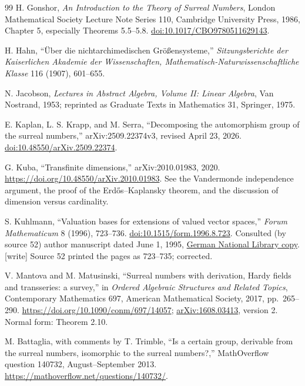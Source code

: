 \documentclass[11pt,letterpaper]{article}
\numberwithin{equation}{section}
\theoremstyle{definition}
\theoremstyle{remark}
\newcommand{\wtag}{\textup{[write]}}%
\begin{document}
\begin{thebibliography}{99}
H. Gonshor,
\emph{An Introduction to the Theory of Surreal Numbers},
London Mathematical Society Lecture Note Series 110,
Cambridge University Press, 1986, Chapter 5, especially Theorems 5.5--5.8.
\href{https://doi.org/10.1017/CBO9780511629143}{doi:10.1017/CBO9780511629143}.

H. Hahn,
``{\"U}ber die nichtarchimedischen Gr{\"o}{\ss}ensysteme,''
\emph{Sitzungsberichte der Kaiserlichen Akademie der Wissenschaften,
Mathematisch-Naturwissenschaftliche Klasse} 116 (1907), 601--655.

N. Jacobson,
\emph{Lectures in Abstract Algebra, Volume II: Linear Algebra},
Van Nostrand, 1953; reprinted as Graduate Texts in Mathematics 31,
Springer, 1975.

E. Kaplan, L. S. Krapp, and M. Serra,
``Decomposing the automorphism group of the surreal numbers,''
arXiv:2509.22374v3, revised April 23, 2026.
\href{https://doi.org/10.48550/arXiv.2509.22374}{doi:10.48550/arXiv.2509.22374}.

G. Kuba, ``Transfinite dimensions,'' arXiv:2010.01983, 2020.
\url{https://doi.org/10.48550/arXiv.2010.01983}.
See the Vandermonde independence argument, the proof of the
Erd\H{o}s--Kaplansky theorem, and the discussion of dimension versus
cardinality.

S. Kuhlmann, ``Valuation bases for extensions of valued vector spaces,''
\emph{Forum Mathematicum} 8 (1996), 723--736.
\href{https://doi.org/10.1515/form.1996.8.723}{doi:10.1515/form.1996.8.723}.
Consulted (by source 52) author manuscript dated June 1, 1995,
\href{https://d-nb.info/1101583150/34}{German National Library copy}.
\wtag{} Source 52 printed the pages as 723--735; corrected.

V. Mantova and M. Matusinski,
``Surreal numbers with derivation, Hardy fields and transseries: a survey,''
in \emph{Ordered Algebraic Structures and Related Topics}, Contemporary
Mathematics 697, American Mathematical Society, 2017, pp.~265--290.
\url{https://doi.org/10.1090/conm/697/14057};
\href{https://arxiv.org/abs/1608.03413}{arXiv:1608.03413}, version 2.
Normal form: Theorem 2.10.

M. Battaglia, with comments by T. Trimble,
``Is a certain group, derivable from the surreal numbers, isomorphic to the
surreal numbers?,'' MathOverflow question 140732, August--September 2013.
\url{https://mathoverflow.net/questions/140732/}.


\end{thebibliography}
\end{document}
